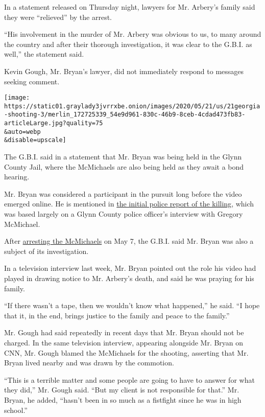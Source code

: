 In a statement released on Thursday night, lawyers for Mr. Arbery's
family said they were ``relieved'' by the arrest.

``His involvement in the murder of Mr. Arbery was obvious to us, to many
around the country and after their thorough investigation, it was clear
to the G.B.I. as well,'' the statement said.

Kevin Gough, Mr. Bryan's lawyer, did not immediately respond to messages
seeking comment.

\texttt{[image: https://static01.graylady3jvrrxbe.onion/images/2020/05/21/us/21georgia-shooting-3/merlin\_172725339\_54e9d961-830c-46b9-8ceb-4cdad473fb83-articleLarge.jpg?quality=75\\\&auto=webp\\\&disable=upscale]}

The G.B.I. said in a statement that Mr. Bryan was being held in the
Glynn County Jail, where the McMichaels are also being held as they
await a bond hearing.

Mr. Bryan was considered a participant in the pursuit long before the
video emerged online. He is mentioned in
\href{https://www.nytimes3xbfgragh.onion/2020/04/26/us/ahmed-arbery-shooting-georgia.html}{the
initial police report of the killing}, which was based largely on a
Glynn County police officer's interview with Gregory McMichael.

After
\href{https://www.nytimes3xbfgragh.onion/2020/05/07/us/ahmaud-arbery-shooting-arrest.html}{arresting
the McMichaels} on May 7, the G.B.I. said Mr. Bryan was also a subject
of its investigation.

In a television interview last week, Mr. Bryan pointed out the role his
video had played in drawing notice to Mr. Arbery's death, and said he
was praying for his family.

``If there wasn't a tape, then we wouldn't know what happened,'' he
said. ``I hope that it, in the end, brings justice to the family and
peace to the family.''

Mr. Gough had said repeatedly in recent days that Mr. Bryan should not
be charged. In the same television interview, appearing alongside Mr.
Bryan on CNN, Mr. Gough blamed the McMichaels for the shooting,
asserting that Mr. Bryan lived nearby and was drawn by the commotion.

``This is a terrible matter and some people are going to have to answer
for what they did,'' Mr. Gough said. ``But my client is not responsible
for that.'' Mr. Bryan, he added, ``hasn't been in so much as a fistfight
since he was in high school.''

